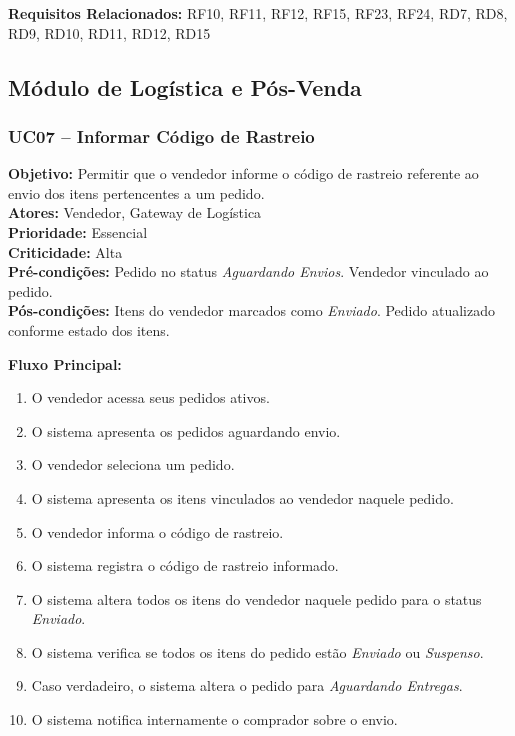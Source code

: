 \documentclass[
	article,			%
	11pt,				%
	oneside,			%
	a4paper,			%
	english,			%
	brazil,				%
	sumario=tradicional
	]{abntex2}
\begin{document}
\vspace{0.5em}
\noindent\textbf{Requisitos Relacionados:} RF10, RF11, RF12, RF15, RF23, RF24, RD7, RD8, RD9, RD10, RD11, RD12, RD15

\subsection{Módulo de Logística e Pós-Venda}

\subsubsection{UC07 – Informar Código de Rastreio}
\label{uc:05}
\noindent\textbf{Objetivo:} Permitir que o vendedor informe o código de rastreio referente ao envio dos itens pertencentes a um pedido.\\
\textbf{Atores:} Vendedor, Gateway de Logística\\
\textbf{Prioridade:} Essencial\\
\textbf{Criticidade:} Alta\\
\textbf{Pré-condições:} Pedido no status \textit{Aguardando Envios}. Vendedor vinculado ao pedido.\\
\textbf{Pós-condições:} Itens do vendedor marcados como \textit{Enviado}. Pedido atualizado conforme estado dos itens.

\vspace{0.5em}
\noindent\textbf{Fluxo Principal:}
\begin{enumerate}[label=\arabic*.]
    \item O vendedor acessa seus pedidos ativos.
    \item O sistema apresenta os pedidos aguardando envio.
    \item O vendedor seleciona um pedido.
    \item O sistema apresenta os itens vinculados ao vendedor naquele pedido.
    \item O vendedor informa o código de rastreio.
    \item O sistema registra o código de rastreio informado.
    \item O sistema altera todos os itens do vendedor naquele pedido para o status \textit{Enviado}.
    \item O sistema verifica se todos os itens do pedido estão \textit{Enviado} ou \textit{Suspenso}.
    \item Caso verdadeiro, o sistema altera o pedido para \textit{Aguardando Entregas}.
    \item O sistema notifica internamente o comprador sobre o envio.
\end{enumerate}
\end{document}
